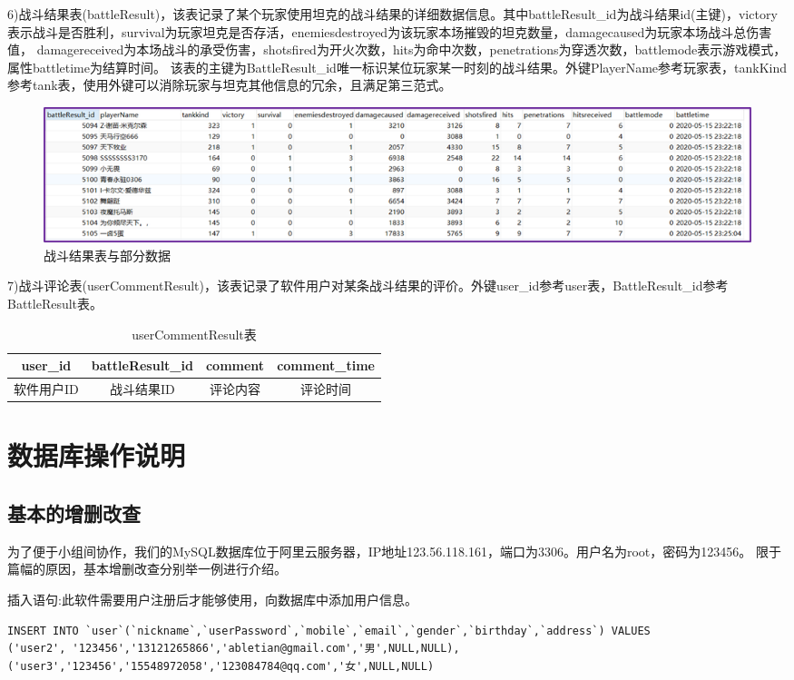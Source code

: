 \documentclass[UTF8, a4paper]{ctexart}
\begin{document}
6)战斗结果表(battleResult)，该表记录了某个玩家使用坦克的战斗结果的详细数据信息。其中battleResult\_id为战斗结果id(主键)，victory表示战斗是否胜利，survival为玩家坦克是否存活，enemiesdestroyed为该玩家本场摧毁的坦克数量，damagecaused为玩家本场战斗总伤害值，
damagereceived为本场战斗的承受伤害，shotsfired为开火次数，hits为命中次数，penetrations为穿透次数，battlemode表示游戏模式，属性battletime为结算时间。
该表的主键为BattleResult\_id唯一标识某位玩家某一时刻的战斗结果。外键PlayerName参考玩家表，tankKind参考tank表，使用外键可以消除玩家与坦克其他信息的冗余，且满足第三范式。
 \begin{figure}[h]
    \centering
    \includegraphics[width=1\textwidth]{result.png}
    \caption{战斗结果表与部分数据}
    \label{fig:damage}
  \end{figure}

7)战斗评论表(userCommentResult)，该表记录了软件用户对某条战斗结果的评价。外键user\_id参考user表，BattleResult\_id参考
BattleResult表。
\begin{table}[H]
\centering
\caption{userCommentResult表}\label{tab:usercomment}
\begin{tabular}{|c|c|c|c|}\hline
user\_id&battleResult\_id&comment&comment\_time\\\hline
软件用户ID&战斗结果ID&评论内容&评论时间\\\hline
\end{tabular}
\end{table}

\section{数据库操作说明}
\subsection{基本的增删改查}
为了便于小组间协作，我们的MySQL数据库位于阿里云服务器，IP地址123.56.118.161，端口为3306。用户名为root，密码为123456。
限于篇幅的原因，基本增删改查分别举一例进行介绍。

插入语句:此软件需要用户注册后才能够使用，向数据库中添加用户信息。
\begin{lstlisting}[style=A]
INSERT INTO `user`(`nickname`,`userPassword`,`mobile`,`email`,`gender`,`birthday`,`address`) VALUES
('user2', '123456','13121265866','abletian@gmail.com','男',NULL,NULL),
('user3','123456','15548972058','123084784@qq.com','女',NULL,NULL)
\end{lstlisting}
\end{document}
